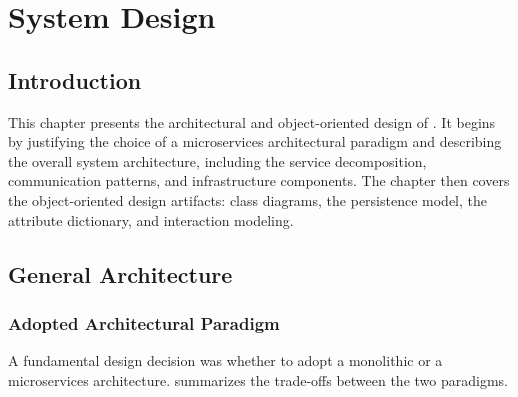 \chapter{System Design}
\label{chap:design}

\section*{Introduction}

This chapter presents the architectural and object-oriented design of \eduspace{}.
It begins by justifying the choice of a microservices architectural paradigm and describing the overall system architecture, including the service decomposition, communication patterns, and infrastructure components.
The chapter then covers the object-oriented design artifacts: class diagrams, the persistence model, the attribute dictionary, and interaction modeling.

\section{General Architecture}
\label{sec:architecture}

\subsection{Adopted Architectural Paradigm}
\label{sec:paradigm}

A fundamental design decision was whether to adopt a monolithic or a microservices architecture.
 summarizes the trade-offs between the two paradigms.

